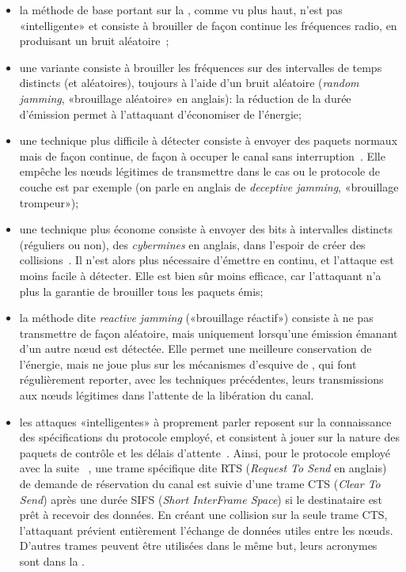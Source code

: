 \begin{itemize}
    \item la méthode de base portant sur la , comme vu plus haut, n'est pas «intelligente» et consiste à brouiller de façon continue les fréquences radio, en produisant un bruit aléatoire~\cite{PI11};
    \item une variante consiste à brouiller les fréquences sur des intervalles de temps distincts (et aléatoires), toujours à l'aide d'un bruit aléatoire (\textit{random jamming}, «brouillage aléatoire» en anglais): la réduction de la durée d'émission permet à l'attaquant d'économiser de l'énergie;
    \item une technique plus difficile à détecter consiste à envoyer des paquets normaux mais de façon continue, de façon à occuper le canal sans interruption~\cite{PI11}. Elle empêche les nœuds légitimes de transmettre dans le cas ou le protocole de couche \mac{} est \csmaca par exemple (on parle en anglais de \textit{deceptive jamming}, «brouillage trompeur»);
    \item une technique plus économe consiste à envoyer des bits à intervalles distincts (réguliers ou non), des \textit{cybermines} en anglais, dans l'espoir de créer des collisions~\cite{PI11}. Il n'est alors plus nécessaire d'émettre en continu, et l'attaque est moins facile à détecter. Elle est bien sûr moins efficace, car l'attaquant n'a plus la garantie de brouiller tous les paquets émis;
    \item la méthode dite \textit{reactive jamming} («brouillage réactif») consiste à ne pas transmettre de façon aléatoire, mais uniquement lorsqu'une émission émanant d'un autre nœud est détectée\cite{PI11}. Elle permet une meilleure conservation de l'énergie, mais ne joue plus sur les mécanismes d'esquive de , qui font régulièrement reporter, avec les techniques précédentes, leurs transmissions aux nœuds légitimes dans l'attente de la libération du canal.
    \item les attaques «intelligentes» à proprement parler reposent sur la connaissance des spécifications du protocole \mac employé, et consistent à jouer sur la nature des paquets de contrôle et les délais d'attente~\cite{PI11}. Ainsi, pour le protocole \csmaca employé avec la suite \ieeee~\cite{ieee802.11}, une trame spécifique dite RTS (\textit{Request To Send} en anglais) de demande de réservation du canal est suivie d'une trame CTS (\textit{Clear To Send}) après une durée SIFS (\textit{Short InterFrame Space}) si le destinataire est prêt à recevoir des données. En créant une collision sur la seule trame CTS, l'attaquant prévient entièrement l'échange de données utiles entre les nœuds. D'autres trames peuvent être utilisées dans le même but, leurs acronymes sont dans la .
\end{itemize}
